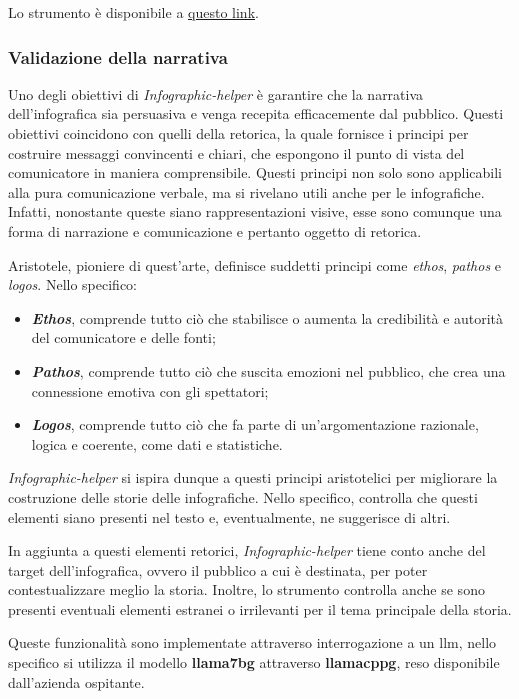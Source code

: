 Lo strumento è disponibile a \href{http://www.overleaf.com}{questo link}.

\subsubsection{Validazione della narrativa}
Uno degli obiettivi di \emph{Infographic-helper} è garantire che la narrativa dell'infografica sia persuasiva e venga recepita efficacemente dal pubblico. 
Questi obiettivi coincidono con quelli della retorica, la quale fornisce i principi per costruire messaggi convincenti e chiari, che espongono il punto di vista del comunicatore in maniera comprensibile. 
Questi principi non solo sono applicabili alla pura comunicazione verbale, ma si rivelano utili anche per le infografiche. 
Infatti, nonostante queste siano rappresentazioni visive, esse sono comunque una forma di narrazione e comunicazione e pertanto oggetto di retorica. 

Aristotele, pioniere di quest'arte, definisce suddetti principi come \emph{ethos}, \emph{pathos} e \emph{logos}. Nello specifico:
\begin{itemize}
    \item \textbf{\emph{Ethos}}, comprende tutto ciò che stabilisce o aumenta la credibilità e autorità del comunicatore e delle fonti;
    \item \textbf{\emph{Pathos}}, comprende tutto ciò che suscita emozioni nel pubblico, che crea una connessione emotiva con gli spettatori;
    \item \textbf{\emph{Logos}}, comprende tutto ciò che fa parte di un'argomentazione razionale, logica e coerente, come dati e statistiche.
\end{itemize}
\emph{Infographic-helper} si ispira dunque a questi principi aristotelici per migliorare la costruzione delle storie delle infografiche. Nello specifico, controlla che questi elementi siano presenti
nel testo e, eventualmente, ne suggerisce di altri.

In aggiunta a questi elementi retorici, \emph{Infographic-helper} tiene conto anche del target dell'infografica, ovvero il pubblico a cui è destinata, per poter contestualizzare meglio la storia. 
Inoltre, lo strumento controlla anche se sono presenti eventuali elementi estranei o irrilevanti per il tema principale della storia. 

\bigskip
\noindent Queste funzionalità sono implementate attraverso interrogazione a un \gls{llm}, nello specifico si utilizza il modello \textbf{\gls{llama7bg}} attraverso \textbf{\gls{llamacppg}}, reso disponibile dall'azienda ospitante.

